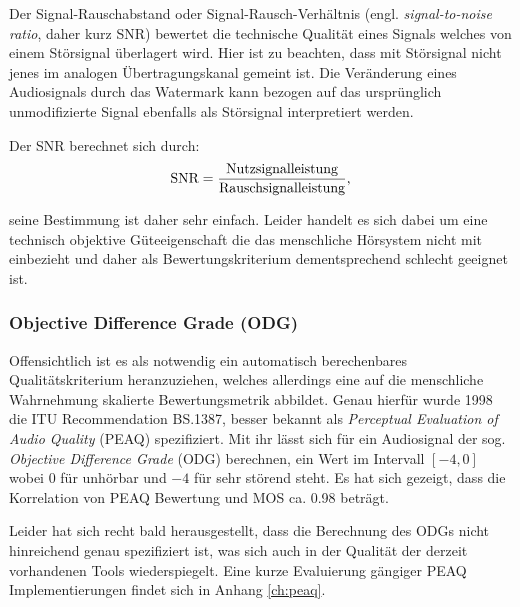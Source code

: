 Der Signal-Rauschabstand oder Signal-Rausch-Verhältnis (engl. \textit{signal-to-noise ratio}, daher kurz SNR) bewertet die technische Qualität eines Signals welches von einem Störsignal überlagert wird. Hier ist zu beachten, dass mit Störsignal nicht jenes im analogen Übertragungskanal gemeint ist. Die Veränderung eines Audiosignals durch das Watermark kann bezogen auf das ursprünglich unmodifizierte Signal ebenfalls als Störsignal interpretiert werden. 

Der SNR berechnet sich durch: 
	\begin{equation}	
		\mbox{SNR} = {\mbox{Nutzsignalleistung} \over \mbox{Rauschsignalleistung}},
		\label{equ:snr}
	\end{equation}

seine Bestimmung ist daher sehr einfach. Leider handelt es sich dabei um eine technisch objektive Güteeigenschaft die das menschliche Hörsystem nicht mit einbezieht und daher als Bewertungskriterium dementsprechend schlecht geeignet ist\cite{xiang2007robust}.

\subsubsection{Objective Difference Grade (ODG)} 

Offensichtlich ist es als notwendig ein automatisch berechenbares Qualitätskriterium heranzuziehen, welches allerdings eine auf die menschliche Wahrnehmung skalierte Bewertungsmetrik abbildet. Genau hierfür wurde 1998 die ITU Recommendation BS.1387\cite{rec1998bs}, besser bekannt als \textit{Perceptual Evaluation of Audio Quality} (PEAQ) spezifiziert. Mit ihr lässt sich für ein Audiosignal der sog. \textit{Objective Difference Grade} (ODG) berechnen, ein Wert im Intervall $[-4,0]$ wobei $0$ für  \glqq{}unhörbar\grqq{} und $-4$ für \glqq{}sehr störend\grqq{} steht. Es hat sich gezeigt, dass die Korrelation von PEAQ Bewertung und MOS ca. 0.98 beträgt\cite{al2011dwt}.

Leider hat sich recht bald herausgestellt, dass die Berechnung des ODGs nicht hinreichend genau spezifiziert ist\cite{kabal2002examination}\cite{campeanu2005peaq}, was sich auch in der Qualität der derzeit vorhandenen Tools wiederspiegelt. Eine kurze Evaluierung gängiger PEAQ Implementierungen findet sich in Anhang \ref{ch:peaq}.


